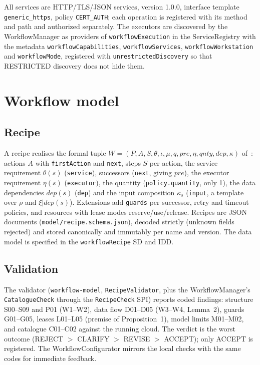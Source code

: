 \documentclass[a4paper]{arrowhead}
\begin{document}
All services are HTTP/TLS/JSON services, version 1.0.0, interface template \texttt{generic\_https}, policy
\texttt{CERT\_AUTH}; each operation is registered with its method and path and authorized separately. The executors are
discovered by the WorkflowManager as providers of \texttt{workflowExecution} in the ServiceRegistry with the metadata
\texttt{workflowCapabilities}, \texttt{workflowServices}, \texttt{workflowWorkstation} and \texttt{workflowMode}, registered
with \texttt{unrestrictedDiscovery} so that RESTRICTED discovery does not hide them.

\section{Workflow model}
\label{sec:model}
\subsection{Recipe}
A recipe realises the formal tuple $W = (P, A, S, \theta, \iota, \mu, q, pre, \eta, qnty, dep, \kappa)$ of~\cite{varga2026}:
actions $A$ with \texttt{firstAction} and \texttt{next}, steps $S$ per action, the service requirement $\theta(s)$
(\texttt{service}), successors (\texttt{next}, giving $pre$), the executor requirement $\eta(s)$ (\texttt{executor}), the
quantity (\texttt{policy.quantity}, only 1), the data dependencies $dep(s)$ (\texttt{dep}) and the input composition
$\kappa_s$ (\texttt{input}, a template over $\rho$ and $\xi|dep(s)$). Extensions add \texttt{guards} per successor,
retry and timeout policies, and resources with lease modes reserve/use/release. Recipes are JSON documents
(\texttt{model/recipe.schema.json}), decoded strictly (unknown fields rejected) and stored canonically and immutably per
name and version. The data model is specified in the \texttt{workflowRecipe} SD and IDD.

\subsection{Validation}
The validator (\texttt{workflow-model}, \texttt{RecipeValidator}, plus the WorkflowManager's \texttt{CatalogueCheck} through
the \texttt{RecipeCheck} SPI) reports coded findings: structure S00--S09 and P01 (W1--W2), data flow D01--D05 (W3--W4,
Lemma~2), guards G01--G05, leases L01--L05 (premise of Proposition~1), model limits M01--M02, and catalogue C01--C02
against the running cloud. The verdict is the worst outcome (REJECT $>$ CLARIFY $>$ REVISE $>$ ACCEPT); only ACCEPT is
registered. The WorkflowConfigurator mirrors the local checks with the same codes for immediate feedback.
\end{document}
